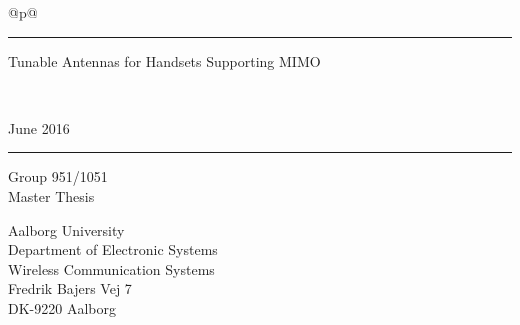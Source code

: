 \thispagestyle{empty}
\noindent%
\begin{tabular}{@{}p{\textwidth}@{}}
    \rule{\linewidth}{2mm}\vspace{1.5cm}
    \vspace*{-15mm}
    \begin{flushleft}
        \linespread{0.7}
        \fontsize{40}{56}
        \selectfont
        Tunable Antennas for Handsets Supporting MIMO
    \end{flushleft} \\[5mm] 
    \raggedright{
        \fontsize{24}{36}\selectfont
        June 2016\\ \vspace*{1mm}
    }
    \rule{\linewidth}{.7mm}
\end{tabular}
\vspace{1cm} %
\begin{flushleft}
  {\LARGE{}\selectfont
      Group 951/1051%
  }\\
  \vspace{0.2cm}
  {\large{}\selectfont
      Master Thesis %
  }
\end{flushleft}
\begin{center}
\end{center}
\vfill
\begin{flushleft}\selectfont
  Aalborg University\\
  Department of Electronic Systems\\
  Wireless Communication Systems\\
  Fredrik Bajers Vej 7\\
  DK-9220 Aalborg
\end{flushleft}
\restoregeometry
